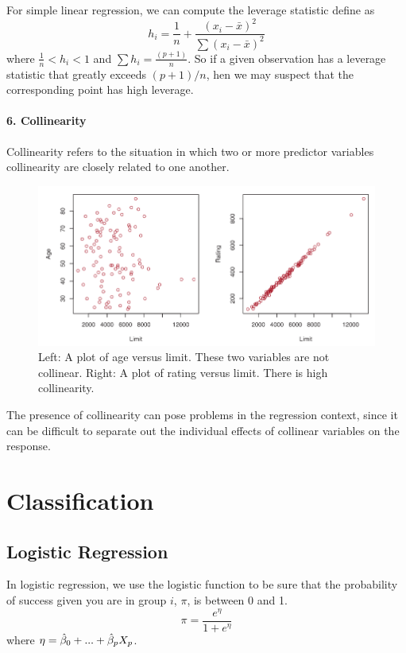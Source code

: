 For simple linear regression, we can compute the leverage statistic define as
\[ h_i = \frac{1}{n} + \frac{(x_i - \bar{x})^2}{\sum (x_i - \bar{x})^2} \]
where $\frac{1}{n} < h_i < 1$ and $\sum h_i = \frac{(p+1)}{n}$.
So if a given observation has a leverage statistic that greatly exceeds $(p+1)/n$, hen we may suspect that the corresponding point has high leverage.

\paragraph{6. Collinearity}
Collinearity refers to the situation in which two or more predictor variables collinearity are closely related to one another.

\begin{figure}[!ht]
    \centering
    \includegraphics[scale=0.6]{src/StatisticalLearning/Collinearity.PNG}
    \caption{Left: A plot of age versus limit. These two variables are not collinear. Right: A plot of rating versus limit. There is high collinearity.}
\end{figure}

The presence of collinearity can pose problems in the regression context, since it can be difficult to separate out the individual effects of collinear variables on the response.

\section{Classification}
\subsection{Logistic Regression}
In logistic regression, we use the logistic function to be sure that the probability of success given you are in group $i$, $\pi$, is between 0 and 1.
\[ \pi = \frac{e^\eta}{1 + e^\eta} \]
where $\eta = \hat{\beta}_0 + ... + \hat{\beta}_p X_p$.

